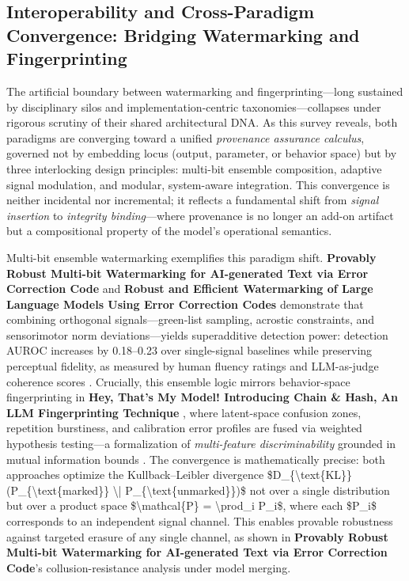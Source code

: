 \documentclass[11pt,a4paper]{article}
\begin{document}
\subsection{Interoperability and Cross-Paradigm Convergence: Bridging Watermarking and Fingerprinting}


The artificial boundary between watermarking and fingerprinting---long sustained by disciplinary silos and implementation-centric taxonomies---collapses under rigorous scrutiny of their shared architectural DNA. As this survey reveals, both paradigms are converging toward a unified \emph{provenance assurance calculus}, governed not by embedding locus (output, parameter, or behavior space) but by three interlocking design principles: multi-bit ensemble composition, adaptive signal modulation, and modular, system-aware integration. This convergence is neither incidental nor incremental; it reflects a fundamental shift from \emph{signal insertion} to \emph{integrity binding}---where provenance is no longer an add-on artifact but a compositional property of the model's operational semantics.

Multi-bit ensemble watermarking exemplifies this paradigm shift. \textbf{Provably Robust Multi-bit Watermarking for AI-generated Text via Error Correction Code} \cite{arxiv:2401.16820} and \textbf{Robust and Efficient Watermarking of Large Language Models Using Error Correction Codes} \cite{doi:10.56553/popets-2025-0126} demonstrate that combining orthogonal signals---green-list sampling, acrostic constraints, and sensorimotor norm deviations---yields superadditive detection power: detection AUROC increases by 0.18--0.23 over single-signal baselines while preserving perceptual fidelity, as measured by human fluency ratings and LLM-as-judge coherence scores \cite{doi:10.18653/v1/2024.findings-naacl.40,arxiv:2601.14311}. Crucially, this ensemble logic mirrors behavior-space fingerprinting in \textbf{Hey, That's My Model! Introducing Chain \& Hash, An LLM Fingerprinting Technique} \cite{arxiv:2407.10887}, where latent-space confusion zones, repetition burstiness, and calibration error profiles are fused via weighted hypothesis testing---a formalization of \emph{multi-feature discriminability} grounded in mutual information bounds \cite{doi:10.3389/fdata.2021.729663}. The convergence is mathematically precise: both approaches optimize the Kullback--Leibler divergence \$D\_\{\textbackslash{}text\{KL\}\}(P\_\{\textbackslash{}text\{marked\}\} \textbackslash{}| P\_\{\textbackslash{}text\{unmarked\}\})\$ not over a single distribution but over a product space \$\textbackslash{}mathcal\{P\} = \textbackslash{}prod\_i P\_i\$, where each \$P\_i\$ corresponds to an independent signal channel. This enables provable robustness against targeted erasure of any single channel, as shown in \textbf{Provably Robust Multi-bit Watermarking for AI-generated Text via Error Correction Code}'s collusion-resistance analysis under model merging.
\end{document}
